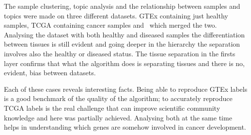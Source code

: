 The sample clustering, topic analysis and the relationship between samples and topics were made on three different datasets. GTEx containing just healthy samples, TCGA containing cancer samples and~\cite{Wang2017} which merged the two. Analysing the dataset with both healthy and diseased samples the differentiation between tissues is still evident and going deeper in the hierarchy the separation involves also the healthy or diseased status. The tissue separation in the firsts layer confirms that what the algorithm does is separating tissues and there is no, evident, bias between datasets.

Each of these cases reveals interesting facts. Being able to reproduce GTEx labels is a good benchmark of the quality of the algorithm; to accurately reproduce TCGA labels is the real challenge that can improve scientific community knowledge and here was partially achieved. Analysing both at the same time helps in understanding which genes are somehow involved in cancer development.